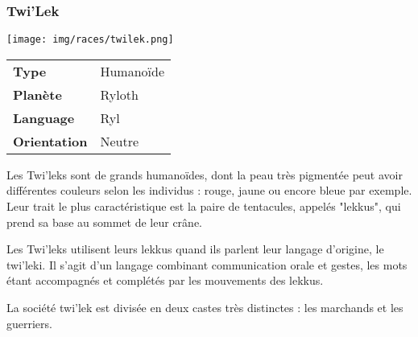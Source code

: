 \subsubsection{Twi'Lek}
\begin{samepage}
	\vspace{-1\baselineskip}
	\texttt{[image: img/races/twilek.png]}
	\vspace{-5\baselineskip}
	\begin{flushright}
		\begin{tabular}{ l l }
			\textbf{Type} 			& Humanoïde \\
		   	\textbf{Planète} 		& Ryloth \\
		   	\textbf{Language} 		& Ryl \\
		   	\textbf{Orientation} 	& Neutre \\
		\end{tabular}
	\end{flushright}
\end{samepage}

Les Twi'leks sont de grands humanoïdes, dont la peau très pigmentée peut avoir différentes couleurs selon les individus : rouge, jaune ou encore bleue par exemple. Leur trait le plus caractéristique est la paire de tentacules, appelés "lekkus", qui prend sa base au sommet de leur crâne.

Les Twi'leks utilisent leurs lekkus quand ils parlent leur langage d'origine, le twi'leki. Il s'agit d'un langage combinant communication orale et gestes, les mots étant accompagnés et complétés par les mouvements des lekkus.

La société twi'lek est divisée en deux castes très distinctes : les marchands et les guerriers.

